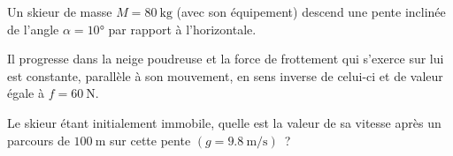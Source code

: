 Un skieur de masse $M=\qty{80}{\kg}$ (avec son équipement) descend une pente
inclinée de l'angle $\alpha=\ang{10}$ par rapport à l'horizontale.

Il progresse dans la neige poudreuse et la force de frottement qui s'exerce sur
lui est constante, parallèle à son mouvement, en sens inverse de celui-ci et de
valeur égale à $f=\qty{60}{\N}$.

Le skieur étant initialement immobile, quelle est la valeur de sa vitesse après
un parcours de $\qty{100}{\m}$ sur cette pente $(g=\qty{9.8}{\m\per\s})$~?
